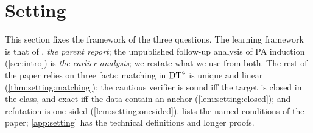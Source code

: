 \section{Setting}\label{sec:setting}


This section fixes the framework of the three questions. The learning framework is that of \citet{claude2026whatfollows}, \emph{the parent report}; the unpublished follow-up analysis of PA induction (\cref{sec:intro}) is \emph{the earlier analysis}; we restate what we use from both. The rest of the paper relies on three facts: matching in $\mathrm{DT}^{\circ}$ is unique and linear (\cref{thm:setting:matching}); the cautious verifier is sound iff the target is closed in the class, and exact iff the data contain an anchor (\cref{lem:setting:closed}); and refutation is one-sided (\cref{lem:setting:onesided}).  lists the named conditions of the paper; \cref{app:setting} has the technical definitions and longer proofs.

